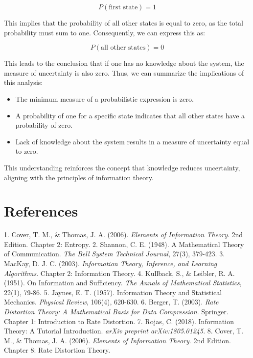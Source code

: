 \documentclass[a4paper]{article}
\begin{document}
\begin{equation}
P(\text{first state}) = 1
\end{equation}

This implies that the probability of all other states is equal to zero, as the total probability must sum to one. Consequently, we can express this as:

\begin{equation}
P(\text{all other states}) = 0
\end{equation}

This leads to the conclusion that if one has no knowledge about the system, the measure of uncertainty is also zero. Thus, we can summarize the implications of this analysis:

\begin{itemize}
    \item The minimum measure of a probabilistic expression is zero.
    \item A probability of one for a specific state indicates that all other states have a probability of zero.
    \item Lack of knowledge about the system results in a measure of uncertainty equal to zero.
\end{itemize}

This understanding reinforces the concept that knowledge reduces uncertainty, aligning with the principles of information theory.

\section{References}
1. Cover, T. M., \& Thomas, J. A. (2006). \textit{Elements of Information Theory}. 2nd Edition. Chapter 2: Entropy.
2. Shannon, C. E. (1948). A Mathematical Theory of Communication. \textit{The Bell System Technical Journal}, 27(3), 379-423.
3. MacKay, D. J. C. (2003). \textit{Information Theory, Inference, and Learning Algorithms}. Chapter 2: Information Theory.
4. Kullback, S., \& Leibler, R. A. (1951). On Information and Sufficiency. \textit{The Annals of Mathematical Statistics}, 22(1), 79-86.
5. Jaynes, E. T. (1957). Information Theory and Statistical Mechanics. \textit{Physical Review}, 106(4), 620-630.
6. Berger, T. (2003). \textit{Rate Distortion Theory: A Mathematical Basis for Data Compression}. Springer. Chapter 1: Introduction to Rate Distortion.
7. Rojas, C. (2018). Information Theory: A Tutorial Introduction. \textit{arXiv preprint arXiv:1805.01245}.
8. Cover, T. M., \& Thomas, J. A. (2006). \textit{Elements of Information Theory}. 2nd Edition. Chapter 8: Rate Distortion Theory.
\end{document}
